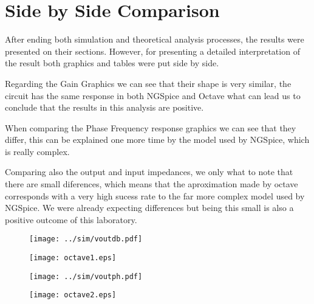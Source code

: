 \section{Side by Side Comparison}
\label{sec:comparison}

After ending both simulation and theoretical analysis processes, the results were presented on their sections. However, for presenting a detailed interpretation of the result both graphics and tables were put side by side.

\par Regarding the Gain Graphics we can see that their shape is very similar, the circuit has the same response in both NGSpice and Octave what can lead us to conclude that the results in this analysis are positive.

\par When comparing the Phase Frequency response graphics we can see that they differ, this can be explained one more time by the model used by NGSpice, which is really complex.

\par Comparing also the output and input impedances, we only what to note that there are small diferences, which means that the aproximation made by octave corresponds with a very high sucess rate to the far more complex model used by NGSpice. We were already expecting differences but being this small is also a positive outcome of this laboratory.

\begin{figure} [H]
\centering
\begin{minipage}{.5\textwidth}
  \centering
  \texttt{[image: ../sim/voutdb.pdf]}
  \label{fig:sim41}
\end{minipage}%
\begin{minipage}{.5\textwidth}
  \centering
  \texttt{[image: octave1.eps]}
  \label{fig:vout_env}
\end{minipage}
\end{figure}



\begin{figure} [H]
\centering
\begin{minipage}{.5\textwidth}
  \centering
  \texttt{[image: ../sim/voutph.pdf]}
  \label{fig:sim41}
\end{minipage}%
\begin{minipage}{.5\textwidth}
  \centering
  \texttt{[image: octave2.eps]}
  \label{fig:vout_env}
\end{minipage}
\end{figure}


